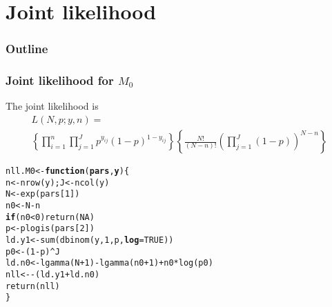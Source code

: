 \documentclass[color=usenames,dvipsnames]{beamer}\usepackage[]{graphicx}\usepackage[]{color}
\makeatletter
\newcommand{\hlnum}[1]{\textcolor[rgb]{0.69,0.494,0}{#1}}%
\newcommand{\hlopt}[1]{\textcolor[rgb]{0,0,0}{#1}}%
\newcommand{\hlstd}[1]{\textcolor[rgb]{0,0,0}{#1}}%
\newcommand{\hlkwa}[1]{\textcolor[rgb]{0,0,0}{\textbf{#1}}}%
\newcommand{\hlkwb}[1]{\textcolor[rgb]{0,0.341,0.682}{#1}}%
\newcommand{\hlkwc}[1]{\textcolor[rgb]{0,0,0}{\textbf{#1}}}%
\newcommand{\hlkwd}[1]{\textcolor[rgb]{0.004,0.004,0.506}{#1}}%
\newenvironment{kframe}{%
 \def\at@end@of@kframe{}%
 \ifinner\ifhmode%
  \def\at@end@of@kframe{\end{minipage}}%
  \begin{minipage}{\columnwidth}%
 \fi\fi%
 \def\FrameCommand##1{\hskip\@totalleftmargin \hskip-\fboxsep
 \colorbox{shadecolor}{##1}\hskip-\fboxsep
     \hskip-\linewidth \hskip-\@totalleftmargin \hskip\columnwidth}%
 \MakeFramed {\advance\hsize-\width
   \@totalleftmargin\z@ \linewidth\hsize
   \@setminipage}}%
 {\par\unskip\endMakeFramed%
 \at@end@of@kframe}
\newenvironment{knitrout}{}{} %
\makeatother
\begin{document}
\section{Joint likelihood}



\begin{frame}
  \frametitle{Outline}
  \Large
  \tableofcontents[currentsection]
\end{frame}


\begin{frame}[fragile]
  \frametitle{Joint likelihood for $M_0$}
  The joint likelihood is
  \begin{multline*}
    L(N,p; y,n) = \\
    \left\{\prod_{i=1}^n \prod_{j=1}^J p^{y_{ij}}(1-p)^{1-y_{ij}}\right\}
    \left\{\frac{N!}{(N-n)!}  \left(\prod_{j=1}^J(1-p)\right)^{N-n} \right\}
  \end{multline*}
  \pause
  \vfill
\begin{knitrout}\scriptsize
{}\color{fgcolor}\begin{kframe}
\begin{alltt}
\hlstd{nll.M0} \hlkwb{<-} \hlkwa{function}\hlstd{(}\hlkwc{pars}\hlstd{,} \hlkwc{y}\hlstd{) \{}
    \hlstd{n} \hlkwb{<-} \hlkwd{nrow}\hlstd{(y);       J} \hlkwb{<-} \hlkwd{ncol}\hlstd{(y)}
    \hlstd{N} \hlkwb{<-} \hlkwd{exp}\hlstd{(pars[}\hlnum{1}\hlstd{])}
    \hlstd{n0} \hlkwb{<-} \hlstd{N}\hlopt{-}\hlstd{n}
    \hlkwa{if}\hlstd{(n0}\hlopt{<}\hlnum{0}\hlstd{)} \hlkwd{return}\hlstd{(}\hlnum{NA}\hlstd{)}
    \hlstd{p} \hlkwb{<-} \hlkwd{plogis}\hlstd{(pars[}\hlnum{2}\hlstd{])}
    \hlstd{ld.y1} \hlkwb{<-} \hlkwd{sum}\hlstd{(}\hlkwd{dbinom}\hlstd{(y,} \hlnum{1}\hlstd{, p,} \hlkwc{log}\hlstd{=}\hlnum{TRUE}\hlstd{))}
    \hlstd{p0} \hlkwb{<-} \hlstd{(}\hlnum{1}\hlopt{-}\hlstd{p)}\hlopt{^}\hlstd{J}
    \hlstd{ld.n0} \hlkwb{<-} \hlkwd{lgamma}\hlstd{(N}\hlopt{+}\hlnum{1}\hlstd{)}\hlopt{-}\hlkwd{lgamma}\hlstd{(n0}\hlopt{+}\hlnum{1}\hlstd{)}\hlopt{+}\hlstd{n0}\hlopt{*}\hlkwd{log}\hlstd{(p0)}
    \hlstd{nll} \hlkwb{<-} \hlopt{-}\hlstd{(ld.y1}\hlopt{+}\hlstd{ld.n0)}
    \hlkwd{return}\hlstd{(nll)}
\hlstd{\}}
\end{alltt}
\end{kframe}
\end{knitrout}
\end{frame}
\end{document}
